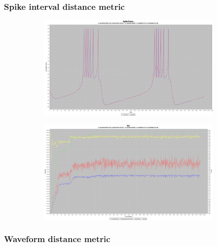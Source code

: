 \documentclass[12pt]{article}
\begin{document}
		\subsubsection{Spike interval distance metric}
			\begin{figure}[H]
				\centering
					\begin{subfigure}{.5\textwidth}
						\centering
						\includegraphics[width=\linewidth]{./../images/izzy3/interval/plot.png}
						
						\label{fig:sub8a}
					\end{subfigure}%
					\begin{subfigure}{.5\textwidth}
						\centering
						\includegraphics[width=\linewidth]{./../images/izzy3/interval/prog.png}
						
						\label{fig:sub8b}
					\end{subfigure}
					
					\label{fig:test}
			\end{figure}
			
		\subsubsection{Waveform distance metric}
		
\end{document}
